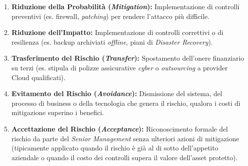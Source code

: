 \begin{enumerate}
    \item \textbf{Riduzione della Probabilità (\textit{Mitigation}):} Implementazione di controlli preventivi (es. firewall, \textit{patching}) per rendere l'attacco più difficile.
    \item \textbf{Riduzione dell'Impatto:} Implementazione di controlli correttivi o di resilienza (es. backup archiviati \textit{offline}, piani di \textit{Disaster Recovery}).
    \item \textbf{Trasferimento del Rischio (\textit{Transfer}):} Spostamento dell'onere finanziario su terzi (es. stipula di polizze assicurative \textit{cyber} o \textit{outsourcing} a provider Cloud qualificati).
    \item \textbf{Evitamento del Rischio (\textit{Avoidance}):} Dismissione del sistema, del processo di business o della tecnologia che genera il rischio, qualora i costi di mitigazione superino i benefici.
    \item \textbf{Accettazione del Rischio (\textit{Acceptance}):} Riconoscimento formale del rischio da parte del \textit{Senior Management} senza ulteriori azioni di mitigazione (tipicamente applicato quando il rischio è già al di sotto dell'appetito aziendale o quando il costo dei controlli supera il valore dell'asset protetto).
\end{enumerate}